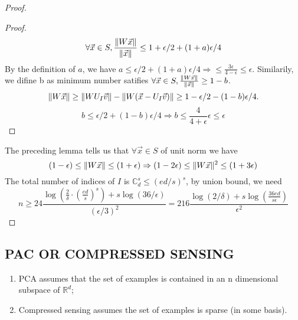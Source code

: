 \begin{theorem}
\begin{proof}
\begin{lemma}
\begin{proof}
\[                \]
                \[
                    \forall \vec{x} \in S, \frac{ \Arrowvert W \vec{x} \Arrowvert}{ \Arrowvert \vec{x} \Arrowvert} \le 1 + \epsilon/2 + (1+a) \epsilon/4
                \]
                By the definition of $ a $, we have $ a \le \epsilon/2 + (1+a) \epsilon/4 \Rightarrow \le \frac{3\epsilon}{4 - \epsilon} \le \epsilon $.
                Similarily, we difine b as minimum number satifies $ \forall \vec{x} \in S, \frac{ \Arrowvert W \vec{x} \Arrowvert}{ \Arrowvert \vec{x} \Arrowvert} \ge 1 - b$.
                \[
                    \Arrowvert W \vec{x} \Arrowvert \ge \Arrowvert W U_I \vec{v} \Arrowvert - \Arrowvert W (\vec{x} - U_I \vec{v}) \Arrowvert \ge 1 - \epsilon/2 - (1 - b) \epsilon/4.
                \]
                \[
                    b \le \epsilon/2 + (1 - b) \epsilon/4 \Rightarrow b \le \frac{4}{4 + \epsilon} \epsilon \le \epsilon
                \]
            \end{proof}
        \end{lemma}
        The preceding lemma tells us that $ \forall \vec{x} \in S $ of unit norm we have
        \[
            (1 - \epsilon) \le \Arrowvert W \vec{x} \Arrowvert \le (1 + \epsilon)
            \Rightarrow (1 - 2\epsilon) \le \Arrowvert W \vec{x} \Arrowvert^2 \le (1 + 3 \epsilon)
        \]
        The total number of indices of $ I $ is $ \mathbb{C}^s_d \le {(ed/s)}^s $, by union bound, we need
        \[
            n \ge 24 \frac{\log\left( \frac{2}{\delta} \cdot {\left( \frac{ed}{s}  \right)}^s \right) + s \log (36 / \epsilon)}{{(\epsilon/3)}^2} = 216 \frac{\log(2/\delta) + s \log \left( \frac{36ed}{s\epsilon}  \right)}{\epsilon^2} 
        \]
        
    \end{proof}
\end{theorem}

\subsection{PAC OR COMPRESSED SENSING}%

\begin{enumerate}
    \item PCA assumes that the set of examples is contained in an n dimensional subspace of $ \mathbb{R}^d $;
    \item Compressed sensing assumes the set of examples is sparse (in some basis).
\end{enumerate}

